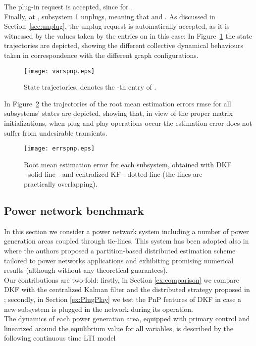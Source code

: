 \documentclass[journal,10pt,draftcls,onecolumn]{IEEEtran}
\begin{document}
The plug-in request is accepted, since  for .\\
Finally, at , subsystem 1 unplugs, meaning that  and . As discussed in Section~\ref{sec:unplug}, the unplug request is automatically accepted, as it is witnessed by the values taken by the entries on  in this case: 
In Figure~\ref{fig:varspnp} the state trajectories are depicted, showing the different collective dynamical behaviours taken in correspondence with the different graph configurations.

\begin{figure}
\centering
\texttt{[image: varspnp.eps]}
\caption{State trajectories.  denotes the -th entry of .}
\label{fig:varspnp}
\end{figure}

In Figure~\ref{fig:errspnp} the trajectories of the root mean estimation errors rmse for all subsystems' states are depicted, showing that, in view of the proper matrix initializations, when plug and play operations occur the estimation error does not suffer from undesirable transients.
\begin{figure}
\centering
\texttt{[image: errspnp.eps]}
\caption{Root mean estimation error for each subsystem, obtained with DKF - solid line - and centralized KF - dotted line (the lines are practically overlapping).}
\label{fig:errspnp}
\end{figure}

\subsection{Power network benchmark}
In this section we consider a power network system including a number of power generation areas coupled through tie-lines. This system has been adopted also in \cite{Negenborn-Kalman13} where the authors proposed a partition-based distributed estimation scheme tailored to power networks applications and exhibiting promising numerical results (although without any theoretical guarantees).\\
Our contributions are two-fold: firstly, in Section \ref{ex:comparison} we compare DKF with the centralized Kalman filter and the distributed strategy proposed in \cite{Negenborn-Kalman13}; secondly, in Section \ref{ex:PlugPlay} we test the PnP features of DKF in case a new subsystem is plugged in the network during its operation.\\
The dynamics of each power generation area, equipped with primary control and linearized around the equilibrium value for all variables, is described by the following continuous time LTI model \cite{SR-GFT:12}
\end{document}
